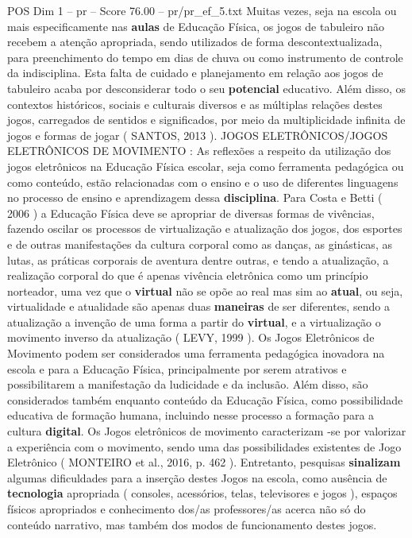 \begin{textsample}{POS Dim 1 – pr – Score 76.00 – pr/pr\_ef\_5.txt}
Muitas vezes, seja na escola ou mais especificamente nas \textbf{aulas} de Educação Física, os jogos de tabuleiro não recebem a atenção apropriada, sendo utilizados de forma descontextualizada, para preenchimento do tempo em dias de chuva ou como instrumento de controle da indisciplina.
Esta falta de cuidado e planejamento em relação aos jogos de tabuleiro acaba por desconsiderar todo o seu \textbf{potencial} educativo.
Além disso, os contextos históricos, sociais e culturais diversos e as múltiplas relações destes jogos, carregados de sentidos e significados, por meio da multiplicidade infinita de jogos e formas de jogar ( SANTOS, 2013 ).
JOGOS ELETRÔNICOS/JOGOS ELETRÔNICOS DE MOVIMENTO : As reflexões a respeito da utilização dos jogos eletrônicos na Educação Física escolar, seja como ferramenta pedagógica ou como conteúdo, estão relacionadas com o ensino e o uso de diferentes linguagens no processo de ensino e aprendizagem dessa \textbf{disciplina}.
Para Costa e Betti ( 2006 ) a Educação Física deve se apropriar de diversas formas de vivências, fazendo oscilar os processos de virtualização e atualização dos jogos, dos esportes e de outras manifestações da cultura corporal como as danças, as ginásticas, as lutas, as práticas corporais de aventura dentre outras, e tendo a atualização, a realização corporal do que é apenas vivência eletrônica como um princípio norteador, uma vez que o \textbf{virtual} não se opõe ao real mas sim ao \textbf{atual}, ou seja, virtualidade e atualidade são apenas duas \textbf{maneiras} de ser diferentes, sendo a atualização a invenção de uma forma a partir do \textbf{virtual}, e a virtualização o movimento inverso da atualização ( LEVY, 1999 ).
Os Jogos Eletrônicos de Movimento podem ser considerados uma ferramenta pedagógica inovadora na escola e para a Educação Física, principalmente por serem atrativos e possibilitarem a manifestação da ludicidade e da inclusão.
Além disso, são considerados também enquanto conteúdo da Educação Física, como possibilidade educativa de formação humana, incluindo nesse processo a formação para a cultura \textbf{digital}.
Os Jogos eletrônicos de movimento caracterizam -se por valorizar a experiência com o movimento, sendo uma das possibilidades existentes de Jogo Eletrônico ( MONTEIRO et al., 2016, p. 462 ).
Entretanto, pesquisas \textbf{sinalizam} algumas dificuldades para a inserção destes Jogos na escola, como ausência de \textbf{tecnologia} apropriada ( consoles, acessórios, telas, televisores e jogos ), espaços físicos apropriados e conhecimento dos/as professores/as acerca não só do conteúdo narrativo, mas também dos modos de funcionamento destes jogos.

\end{textsample}
